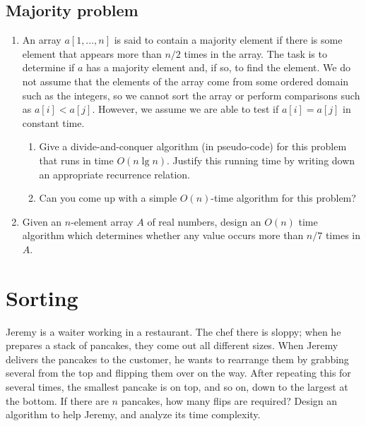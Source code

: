 \subsection{Majority problem}
\begin{Exercise}
\begin{enumerate}
\item An array $a[1, \dots, n]$ is said to contain a majority element if there is some element that appears more than $n/2$ times in the array. The task is to determine if $a$ has a majority element and, if so, to find the element. We do not assume that the elements of the array come from some ordered domain such as the integers, so we cannot sort the array or perform comparisons such as $a[i] < a[j]$. However, we assume we are able to test if $a[i] = a[j]$ in constant time.
\begin{enumerate}
\item Give a divide-and-conquer algorithm (in pseudo-code) for this problem that runs in time $O(n \lg n)$. Justify this running time by writing down an appropriate recurrence relation.
\item Can you come up with a simple $O(n)$-time algorithm for this problem? 
\end{enumerate}
\item Given an $n$-element array $A$ of real numbers, design an $O(n)$ time algorithm which determines whether any value occurs more than $n/7$ times in $A$. 
\end{enumerate}
\end{Exercise}
\begin{Answer}
\end{Answer}

\section{Sorting}

\begin{Exercise}
Jeremy is a waiter working in a restaurant. The chef there is sloppy; when he prepares a stack of pancakes, they come out all different sizes. When Jeremy delivers the pancakes to the customer, he wants to rearrange them by grabbing several from the top and flipping them over on the way. After repeating this for several times, the smallest pancake is on top, and so on, down to the largest at the bottom. If there are $n$ pancakes, how many flips are required? Design an algorithm to help Jeremy, and analyze its time complexity.  
\end{Exercise}
\begin{Answer}
\end{Answer}

